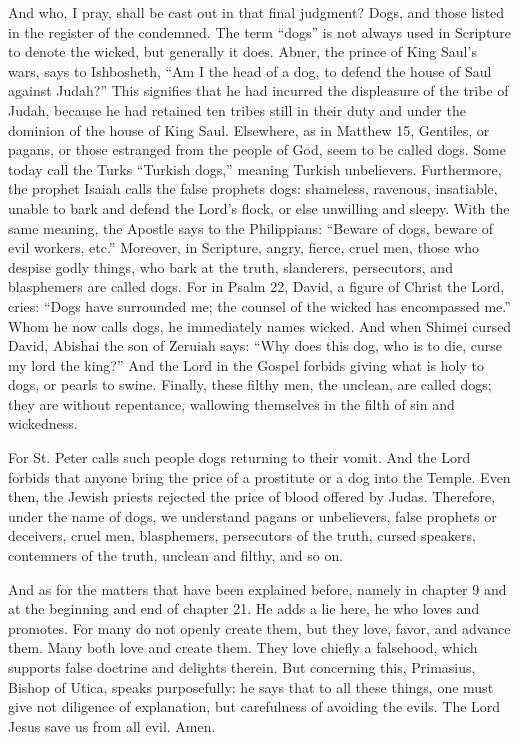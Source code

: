 And who, I pray, shall be cast out in that final judgment? Dogs, and those listed in the register of the condemned. The term “dogs” is not always used in Scripture to denote the wicked, but generally it does. Abner, the prince of King Saul’s wars, says to Ishbosheth, “Am I the head of a dog, to defend the house of Saul against Judah?” This signifies that he had incurred the displeasure of the tribe of Judah, because he had retained ten tribes still in their duty and under the dominion of the house of King Saul. Elsewhere, as in Matthew 15, Gentiles, or pagans, or those estranged from the people of God, seem to be called dogs. Some today call the Turks “Turkish dogs,” meaning Turkish unbelievers. Furthermore, the prophet Isaiah calls the false prophets dogs: shameless, ravenous, insatiable, unable to bark and defend the Lord’s flock, or else unwilling and sleepy. With the same meaning, the Apostle says to the Philippians: “Beware of dogs, beware of evil workers, etc.” Moreover, in Scripture, angry, fierce, cruel men, those who despise godly things, who bark at the truth, slanderers, persecutors, and blasphemers are called dogs. For in Psalm 22, David, a figure of Christ the Lord, cries: “Dogs have surrounded me; the counsel of the wicked has encompassed me.” Whom he now calls dogs, he immediately names wicked. And when Shimei cursed David, Abishai the son of Zeruiah says: “Why does this dog, who is to die, curse my lord the king?” And the Lord in the Gospel forbids giving what is holy to dogs, or pearls to swine. Finally, these filthy men, the unclean, are called dogs; they are without repentance, wallowing themselves in the filth of sin and wickedness.

For St. Peter calls such people dogs returning to their vomit. And the Lord forbids that anyone bring the price of a prostitute or a dog into the Temple. Even then, the Jewish priests rejected the price of blood offered by Judas. Therefore, under the name of dogs, we understand pagans or unbelievers, false prophets or deceivers, cruel men, blasphemers, persecutors of the truth, cursed speakers, contemners of the truth, unclean and filthy, and so on.

And as for the matters that have been explained before, namely in chapter 9 and at the beginning and end of chapter 21. He adds a lie here, he who loves and promotes. For many do not openly create them, but they love, favor, and advance them. Many both love and create them. They love chiefly a falsehood, which supports false doctrine and delights therein. But concerning this, Primasius, Bishop of Utica, speaks purposefully: he says that to all these things, one must give not diligence of explanation, but carefulness of avoiding the evils. The Lord Jesus save us from all evil. Amen.
